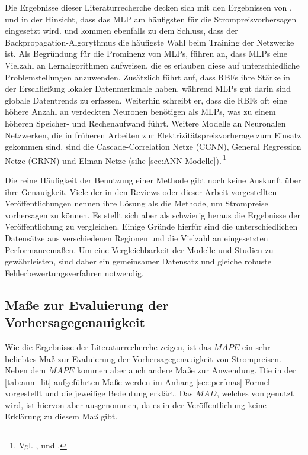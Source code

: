 Die Ergebnisse dieser Literaturrecherche decken sich mit den Ergebnissen von \citet{Aggarwal2009}, \citet{Weron2014} und \citet{Panapakidis2016} in der Hinsicht, dass das MLP am häufigsten für die Strompreisvorhersagen eingesetzt wird. \citet{Aggarwal2009} und \citet{Weron2014} kommen ebenfalls zu dem Schluss, dass der Backpropagation-Algorythmus die häufigste Wahl beim Training der Netzwerke ist. Als Begründung für die Prominenz von MLPs, führen \citet{Panapakidis2016} an, dass MLPs eine Vielzahl an Lernalgorithmen aufweisen, die es erlauben diese auf unterschiedliche Problemstellungen anzuwenden. Zusätzlich führt \citet{Weron2014} auf, dass RBFs ihre Stärke in der Erschließung lokaler Datenmerkmale haben, während MLPs gut darin sind globale Datentrends zu erfassen. Weiterhin schreibt er, dass die RBFs oft eine höhere Anzahl an verdeckten Neuronen benötigen als MLPs, was zu einem höheren Speicher- und Rechenaufwand führt. 
Weitere Modelle an Neuronalen Netzwerken, die in früheren Arbeiten zur Elektrizitätspreisvorherage zum Einsatz gekommen sind, sind die Cascade-Correlation Netze (CCNN), General Regression Netze (GRNN) und Elman Netze (sihe \autoref{sec:ANN-Modelle}).\,\footnote{Vgl. \citet[757]{Cerjan2013}, \citet[28 ff]{Weron2014} und \citet[134]{Panapakidis2016}.}

Die reine Häufigkeit der Benutzung einer Methode gibt noch keine Auskunft über ihre Genauigkeit. Viele der in den Reviews oder dieser Arbeit vorgestellten Veröffentlichungen nennen ihre Lösung als die Methode, um Strompreise vorhersagen zu können. Es stellt sich aber als schwierig heraus die Ergebnisse der Veröffentlichung zu vergleichen. Einige Gründe hierfür sind die unterschiedlichen Datensätze aus verschiedenen Regionen und die Vielzahl an eingesetzten Performancemaßen. Um eine Vergleichbarkeit der Modelle und Studien zu gewährleisten, sind daher ein gemeinsamer Datensatz und gleiche robuste Fehlerbewertungsverfahren notwendig.\, %

\subsection{Maße zur Evaluierung der Vorhersagegenauigkeit}\label{sec:eval_maße}

Wie die Ergebnisse der Literaturrecherche zeigen, ist das $MAPE$ ein sehr beliebtes Maß zur Evaluierung der Vorhersagegenauigkeit von Strompreisen. Neben dem $MAPE$ kommen aber auch andere Maße zur Anwendung. Die in der \autoref{tab:ann_lit} aufgeführten Maße werden im Anhang \ref{sec:perfmas} Formel vorgestellt und die jeweilige Bedeutung erklärt. Das $MAD$, welches von \citet{Keles2016} genutzt wird, ist hiervon aber ausgenommen, da es in der Veröffentlichung keine Erklärung zu diesem Maß gibt.


